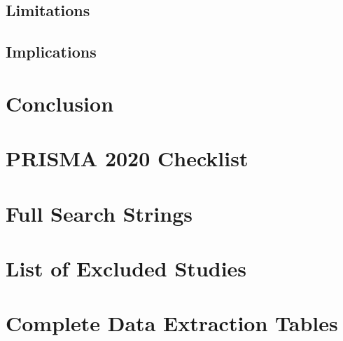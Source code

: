 \subsection{Limitations}\label{sec:limitations}

\subsection{Implications}\label{sec:implications}

\section{Conclusion}\label{sec:conclusion}




\appendix

\section{PRISMA 2020 Checklist}\label{app:prisma-2020}



\section{Full Search Strings}\label{app:search-strings}


\section{List of Excluded Studies}\label{app:excluded}


\section{Complete Data Extraction Tables}\label{app:extraction}



